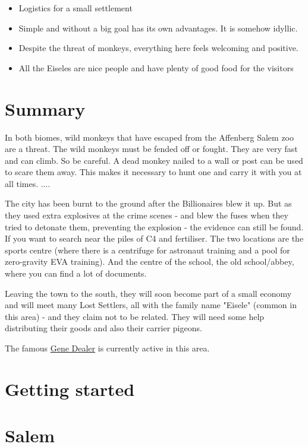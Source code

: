 \begin{itemize}
    \item Logistics for a small settlement
    \item Simple and without a big goal has its own advantages. It is somehow idyllic.
    \item Despite the threat of monkeys, everything here feels welcoming and positive.
    \item All the Eiseles are nice people and have plenty of good food for the visitors
\end{itemize}

\section{Summary}

In both biomes, wild monkeys that have escaped from the Affenberg Salem zoo are a threat. The wild monkeys must be fended off or fought. They are very fast and can climb. So be careful. A dead monkey nailed to a wall or post can be used to scare them away. This makes it necessary to hunt one and carry it with you at all times. ....

The city has been burnt to the ground after the Billionaires blew it up. But as they used extra explosives at the crime scenes - and blew the fuses when they tried to detonate them, preventing the explosion - the evidence can still be found. If you want to search near the piles of C4 and fertiliser. The two locations are the sports centre (where there is a centrifuge for astronaut training and a pool for zero-gravity EVA training). And the centre of the school, the old school/abbey, where you can find a lot of documents.

Leaving the town to the south, they will soon become part of a small economy and will meet many Lost Settlers, all with the family name "Eisele" (common in this area) - and they claim not to be related.
They will need some help distributing their goods and also their carrier pigeons.

The famous \hyperref[sec:Gene Dealer]{Gene Dealer} is currently active in this area.

\section{Getting started}

\section{Salem}

